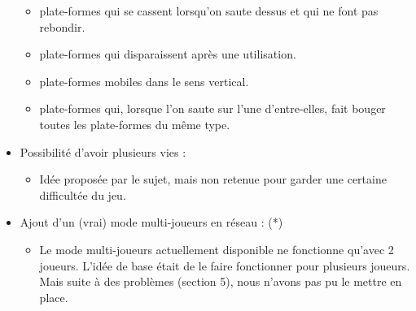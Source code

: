 \documentclass{article}
\begin{document}
\begin{itemize}
\begin{itemize}
        \item plate-formes qui se cassent lorsqu'on saute dessus et qui ne font pas rebondir.
        \item plate-formes qui disparaissent après une utilisation.
        \item plate-formes mobiles dans le sens vertical.
        \item plate-formes qui, lorsque l'on saute sur l'une d'entre-elles, fait bouger toutes les plate-formes du même type.
    \end{itemize}
    \item Possibilité d'avoir plusieurs vies :
    \begin{itemize}
        \item Idée proposée par le sujet, mais non retenue pour garder une certaine difficultée du jeu.
    \end{itemize}
    \item Ajout d'un (vrai) mode multi-joueurs en réseau : (*)
    \begin{itemize}
        \item Le mode multi-joueurs actuellement disponible ne fonctionne qu'avec 2 joueurs. L'idée de base était de le faire fonctionner pour plusieurs joueurs. Mais suite à des problèmes (section 5), nous n'avons pas pu le mettre en place.
    \end{itemize}
\end{itemize}
\end{document}
